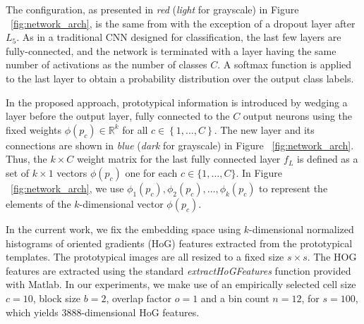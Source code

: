 \documentclass{bmvc2k}
\begin{document}
The configuration, as presented in \textit{red} (\textit{light} for grayscale)
in Figure ~\ref{fig:network_arch}, is the same from {\cite{multicolumnarDNN}}
with the exception of a dropout layer after $L_{5}$.
As in a traditional CNN designed for classification, the last few layers are fully-connected, and the 
network is terminated with a layer having the same number of activations as the number of classes $C$. 
A softmax function is applied to the last layer to obtain a probability distribution over the output class 
labels. 

In the proposed approach, prototypical information is introduced by wedging a layer before the output 
layer, fully connected to the $C$ output neurons using the fixed weights $\phi(p_c)\in \mathbb{R}^k$ for 
all $c\in\left\{ 1,\ldots,C\right\}$. The new layer and its connections are
shown in \textit{blue} (\textit{dark} for grayscale) in
Figure ~\ref{fig:network_arch}.
Thus, the $k\times C$ weight matrix for the last fully connected layer $f_{L}$
is defined as a set of $k\times1$ vectors $\phi(p_c)$ one for each
$c\in\{{1,\ldots, C}\}$. In Figure ~\ref{fig:network_arch}, we use $\phi_1(p_c),
\phi_2(p_c), \ldots,  \phi_k(p_c)$ to represent the elements of the $k$-dimensional vector $\phi(p_c)$.

In the current work, we fix the embedding space using $k$-dimensional
normalized histograms of oriented gradients (HoG) {\cite{dalal2005histograms}} features
extracted from the prototypical templates. The prototypical images are all resized to a fixed size $s\times s$.
The HOG features are extracted using the standard \textit{extractHoGFeatures} function provided with Matlab. 
In our experiments, we make use of an empirically selected cell size $c=10$, block size $b=2$,  
overlap factor $o=1$ and a bin count $n=12$, for $s=100$, which yields $3888$-dimensional HoG features.
\end{document}
